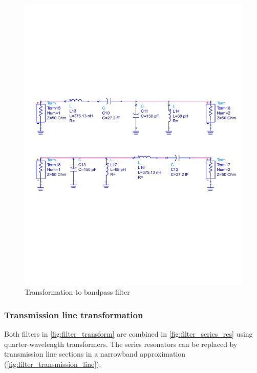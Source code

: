 \documentclass[a4paper]{article}        %
\begin{document}
  \begin{figure}[H]
    \centering
    \includegraphics[width=\textwidth]{fig/Filter/2nd_order/bandpass_discrete.pdf}
    \caption{Transformation to bandpass filter}
    \label{fig:filter_transform}
  \end{figure}

  \subsubsection{Transmission line transformation}
  Both filters in \autoref{fig:filter_transform} are combined in \autoref{fig:filter_series_res} using quarter-wavelength transformers. 
  The series resonators can be replaced by transmission line sections in a narrowband approximation (\autoref{fig:filter_transmission_line}).
\end{document}
